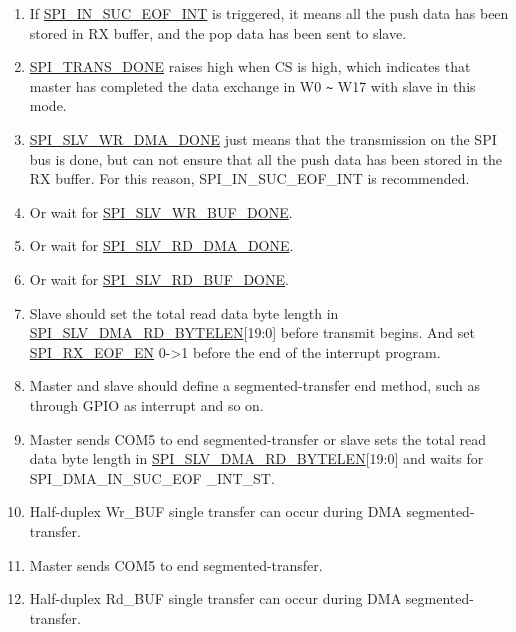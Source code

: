 \documentclass[main\_\_EN.tex]{subfiles}
\begin{document}
\begin{landscape}
\begin{tiplisting}
\vspace{-2em}
\begin{enumerate}
\item If \hyperref[int:SPIINSUCEOFINT]{SPI\_IN\_SUC\_EOF\_INT} is triggered, it means all the push data has been stored in RX buffer, and the pop data has been sent to slave. \label{slave-note-1}
\item \hyperref[fielddesc:SPITRANSDONE]{SPI\_TRANS\_DONE} raises high when CS is high, which indicates that master has completed the data exchange in W0 \verb+~+ W17 with slave in this mode.\label{slave-note-2}
\item \hyperref[fielddesc:SPISLVWRDMADONE]{SPI\_SLV\_WR\_DMA\_DONE} just means that the transmission on the SPI bus is done, but can not ensure that all the push data has been stored in the RX buffer. For this reason, SPI\_IN\_SUC\_EOF\_INT is recommended. \label{slave-note-3}
\item Or wait for \hyperref[fielddesc:SPISLVWRBUFDONE]{SPI\_SLV\_WR\_BUF\_DONE}.\label{slave-note-4}
\item Or wait for \hyperref[fielddesc:SPISLVRDDMADONE]{SPI\_SLV\_RD\_DMA\_DONE}.\label{slave-note-5}
\item Or wait for \hyperref[fielddesc:SPISLVRDBUFDONE]{SPI\_SLV\_RD\_BUF\_DONE}.\label{slave-note-6}
\item Slave should set the total read data byte length in \hyperref[fielddesc:SPISLVDMARDBYTELEN]{SPI\_SLV\_DMA\_RD\_BYTELEN}[19:0] before transmit begins. And set \hyperref[fielddesc:SPIRXEOFEN]{SPI\_RX\_EOF\_EN} 0->1 before the end of the interrupt program.\label{slave-note-7}
\item Master and slave should define a segmented-transfer end method, such as through GPIO as interrupt and so on.\label{slave-note-8}
\item Master sends COM5 to end segmented-transfer or slave sets the total read data byte length in \hyperref[fielddesc:SPISLVDMARDBYTELEN]{SPI\_SLV\_DMA\_RD\_BYTELEN}[19:0] and waits for SPI\_DMA\_IN\_SUC\_EOF \_INT\_ST.\label{slave-note-9}
\item Half-duplex Wr\_BUF single transfer can occur during DMA segmented-transfer.\label{slave-note-10}
\item Master sends COM5 to end segmented-transfer.\label{slave-note-11}
\item Half-duplex Rd\_BUF single transfer can occur during DMA segmented-transfer.\label{slave-note-12}
\end{enumerate}
\end{tiplisting}
\end{landscape}
\end{document}
